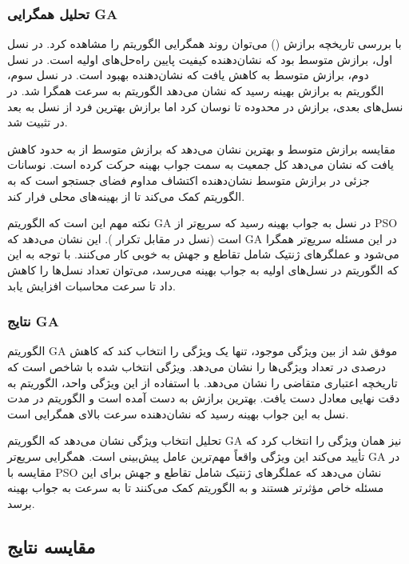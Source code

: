 \documentclass{article}
\begin{document}
\subsubsection{تحلیل همگرایی GA}

با بررسی تاریخچه برازش () می‌توان روند همگرایی الگوریتم را مشاهده کرد. در نسل اول، برازش متوسط  بود که نشان‌دهنده کیفیت پایین راه‌حل‌های اولیه است. در نسل دوم، برازش متوسط به  کاهش یافت که نشان‌دهنده بهبود است. در نسل سوم، الگوریتم به برازش بهینه  رسید که نشان می‌دهد الگوریتم به سرعت همگرا شد. در نسل‌های بعدی، برازش در محدوده  تا  نوسان کرد اما برازش بهترین فرد از نسل  به بعد در  تثبیت شد.

مقایسه برازش متوسط و بهترین نشان می‌دهد که برازش متوسط از  به حدود  کاهش یافت که نشان می‌دهد کل جمعیت به سمت جواب بهینه حرکت کرده است. نوسانات جزئی در برازش متوسط نشان‌دهنده اکتشاف مداوم فضای جستجو است که به الگوریتم کمک می‌کند تا از بهینه‌های محلی فرار کند.

نکته مهم این است که الگوریتم GA در نسل  به جواب بهینه رسید که سریع‌تر از PSO است (نسل  در مقابل تکرار ). این نشان می‌دهد که GA در این مسئله سریع‌تر همگرا می‌شود و عملگرهای ژنتیک شامل تقاطع و جهش به خوبی کار می‌کنند. با توجه به این که الگوریتم در نسل‌های اولیه به جواب بهینه می‌رسد، می‌توان تعداد نسل‌ها را کاهش داد تا سرعت محاسبات افزایش یابد.

\subsubsection{نتایج GA}

الگوریتم GA موفق شد از بین  ویژگی موجود، تنها یک ویژگی را انتخاب کند که کاهش  درصدی در تعداد ویژگی‌ها را نشان می‌دهد. ویژگی انتخاب شده  با شاخص  است که تاریخچه اعتباری متقاضی را نشان می‌دهد. با استفاده از این ویژگی واحد، الگوریتم به دقت نهایی  معادل  دست یافت. بهترین برازش به دست آمده  است و الگوریتم در مدت  نسل به این جواب بهینه رسید که نشان‌دهنده سرعت بالای همگرایی است.

تحلیل انتخاب ویژگی نشان می‌دهد که الگوریتم GA نیز همان ویژگی  را انتخاب کرد که تأیید می‌کند این ویژگی واقعاً مهم‌ترین عامل پیش‌بینی است. همگرایی سریع‌تر GA در مقایسه با PSO نشان می‌دهد که عملگرهای ژنتیک شامل تقاطع و جهش برای این مسئله خاص مؤثرتر هستند و به الگوریتم کمک می‌کنند تا به سرعت به جواب بهینه برسد.

\subsection{مقایسه نتایج}
\end{document}
